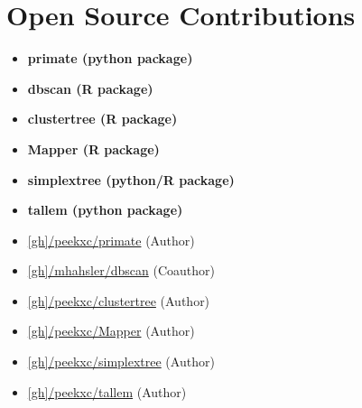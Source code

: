 \documentclass[11pt,a4paper,sans]{moderncv} %
\newenvironment{twoitemize}
 {\begin{multicols}{2}\raggedright\begin{itemize}}
 {\end{itemize}\end{multicols}}
\begin{document}
%
%

%
%
%


\section{Open Source Contributions}\label{sec:opensrc}
\vspace{-1.4em}
\begin{twoitemize}[label={}, leftmargin=0pt, noitemsep, topsep=0pt]
	\setlength\itemsep{0.0em}
	\item\textbf{primate (python package)} 
	\item\textbf{dbscan (R package)} 
	\item\textbf{clustertree (R package)} 
	\item\textbf{Mapper (R package)} 
	\item\textbf{simplextree (python/R package)} 
	\item\textbf{tallem (python package)} 

	\item \href{https://github.com/peekxc}{[gh]/peekxc/primate} \hfill (Author)
	\item \href{https://github.com/peekxc}{[gh]/mhahsler/dbscan} \hfill (Coauthor)
	\item \href{https://github.com/peekxc}{[gh]/peekxc/clustertree} \hfill (Author)
	\item \href{https://github.com/peekxc}{[gh]/peekxc/Mapper} \hfill (Author)
	\item \href{https://github.com/peekxc}{[gh]/peekxc/simplextree} \hfill (Author)
	\item \href{https://github.com/peekxc}{[gh]/peekxc/tallem} \hfill (Author)
\end{twoitemize}
\end{document}
